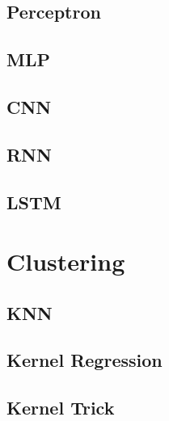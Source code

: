 \documentclass[18pt,a3paper,landscape, ncols=3]{cheatsheet}
\begin{document}
	\subsection{Perceptron}
		\begin{mdframed}
		\end{mdframed}
	\subsection{MLP}
		\begin{mdframed}
		\end{mdframed}
	\subsection{CNN}
		\begin{mdframed}
		\end{mdframed}
	\subsection{RNN}
		\begin{mdframed}
		\end{mdframed}
	\subsection{LSTM}
		\begin{mdframed}
		\end{mdframed}

\section{Clustering} \seperator %
	\subsection{KNN}
		\begin{mdframed}
		\end{mdframed}
	\subsection{Kernel Regression}
		\begin{mdframed}
		\end{mdframed}
	\subsection{Kernel Trick}
		\begin{mdframed}
		\end{mdframed}

\end{document}

